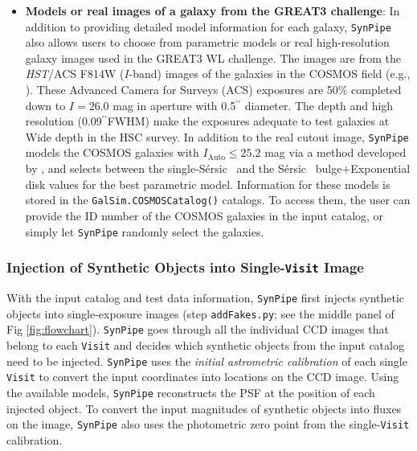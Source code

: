 \documentclass[useamsfonts]{pasj01}
\def\asec{$^{\prime\prime}$}
\def\ser{{S\'{e}rsic\ }}
\def\synpipe{\texttt{SynPipe}}
\def\visit{\texttt{Visit}}
\def\hst{{\textit{HST}}}
\begin{document}
\begin{itemize}
        \item \textbf{Models or real images of a galaxy from the GREAT3 challenge}:
            In addition to providing detailed model information for each galaxy, 
            \synpipe{} also allows users to choose from parametric models or real
            high-resolution galaxy images used in the GREAT3 WL challenge.
            The images are from the \hst{}/ACS F814W ($I$-band) images of the galaxies
            in the COSMOS field (e.g., \citealt{Scoville2007}).
            These Advanced Camera for Surveys (ACS) exposures are 50\% completed down 
            to $I=26.0$ mag in aperture with 0.5\asec{} diameter.
            The depth and high resolution (0.09\asec FWHM) make the exposures adequate 
            to test galaxies at Wide depth in the HSC survey.
            In addition to the real cutout image, \synpipe{} models the COSMOS galaxies 
            with $I_{\mathrm{Auto}}\leq25.2$ mag via a method developed by
            \citet{Lackner2012}, and selects between the single-\ser{} and the \ser{} 
            bulge$+$Exponential disk values for the best parametric model.
            Information for these models is stored in the 
            \texttt{GalSim.COSMOSCatalog()} catalogs.
            To access them, the user can provide the ID number of the COSMOS galaxies 
            in the input catalog, or simply let \synpipe{} randomly select the galaxies.

    \end{itemize}

\subsubsection{Injection of Synthetic Objects into Single-\visit{} Image}
    \label{sssec:addFakes}

    With the input catalog and test data information, \synpipe{} first injects synthetic 
    objects into single-exposure images (step \texttt{addFakes.py}; see the middle panel 
    of Fig \ref{fig:flowchart}).
    \synpipe{} goes through all the individual CCD images that belong to each \visit{} 
    and decides which synthetic objects from the input catalog need to be injected.
    \synpipe{} uses the \textit{initial astrometric calibration} of each single
    \visit{} to convert the input coordinates into locations on the CCD image.
    Using the available models, \synpipe{} reconstructs the PSF at the position of
    each injected object.
    To convert the input magnitudes of synthetic objects into fluxes on the image,
    \synpipe{} also uses the photometric zero point from the single-\visit{}
    calibration.
\end{document}
